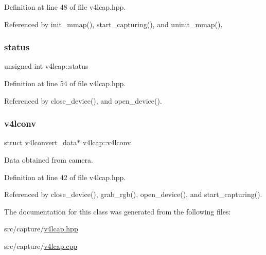 Definition at line 48 of file v4lcap.\+hpp.



Referenced by init\+\_\+mmap(), start\+\_\+capturing(), and uninit\+\_\+mmap().

\mbox{\label{classv4lcap_ae90192b024d952b464408e0ffd95d90a}} 
\subsubsection{\texorpdfstring{status}{status}}
{\footnotesize\ttfamily unsigned int v4lcap\+::status}



Definition at line 54 of file v4lcap.\+hpp.



Referenced by close\+\_\+device(), and open\+\_\+device().

\mbox{\label{classv4lcap_a5e57bbf84383d7b42d0cc9d1e7e03abb}} 
\subsubsection{\texorpdfstring{v4lconv}{v4lconv}}
{\footnotesize\ttfamily struct v4lconvert\+\_\+data$\ast$ v4lcap\+::v4lconv}



Data obtained from camera. 



Definition at line 42 of file v4lcap.\+hpp.



Referenced by close\+\_\+device(), grab\+\_\+rgb(), open\+\_\+device(), and start\+\_\+capturing().



The documentation for this class was generated from the following files\+:\begin{DoxyCompactItemize}
\item 
src/capture/\hyperlink{v4lcap_8hpp}{v4lcap.\+hpp}\item 
src/capture/\hyperlink{v4lcap_8cpp}{v4lcap.\+cpp}\end{DoxyCompactItemize}
